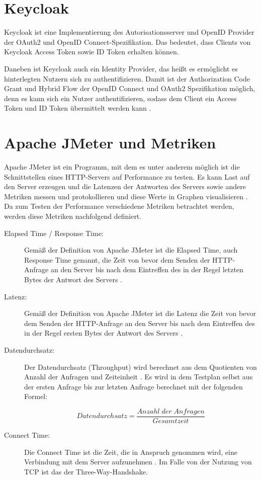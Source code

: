 \section{Keycloak}
Keycloak ist eine Implementierung des Autorisationsserver und OpenID Provider der 
OAuth2 und OpenID Connect-Spezifikation. Das bedeutet, dass Clients von Keycloak Access 
Token sowie ID Token erhalten können.\smallskip

Daneben ist Keycloak auch ein Identity Provider, das heißt es ermöglicht es hinterlegten 
Nutzern sich zu authentifizieren. Damit ist der Authorization Code Grant und 
Hybrid Flow der OpenID Connect und OAuth2 Spezifikation möglich, denn es kann sich ein 
Nutzer authentifizieren, sodass dem Client ein Access Token und ID Token übermittelt 
werden kann \citep{keycloak:2021}.

\section{Apache JMeter und Metriken}
\label{sec:ApacheJMeterundMetriken}
Apache JMeter ist ein Programm, mit dem es unter anderem möglich ist die Schnittstellen eines HTTP-Servers auf 
Performance zu testen. Es kann Last auf den Server erzeugen und die Latenzen der Antworten des Servers sowie andere Metriken messen und protokollieren und diese Werte in Graphen visualisieren \citep{jmeter:2021}.
Da zum Testen der Performance verschiedene Metriken betrachtet werden, werden diese 
Metriken nachfolgend definiert. 

\begin{description}
  \item[Elapsed Time / Response Time:] Gemäß der Definition von Apache JMeter ist die Elapsed Time, auch Response Time 
  genannt, die Zeit von bevor dem Senden der HTTP-Anfrage an den Server bis nach dem 
  Eintreffen des in der Regel letzten Bytes der Antwort des Servers \citep{jmeterglossary:2021}. 
  \item[Latenz:] Gemäß der Definition von Apache JMeter ist die Latenz die Zeit von bevor dem Senden der 
  HTTP-Anfrage an den Server bis nach dem Eintreffen des in der Regel ersten Bytes der 
  Antwort des Servers \citep{jmeterglossary:2021}. 
  \item[Datendurchsatz:] Der Datendurchsatz (Throughput) wird berechnet aus dem Quotienten von Anzahl der Anfragen 
  und Zeiteinheit \citep{jmeterglossary:2021}. Es wird in dem Testplan selbst aus der ersten Anfrage bis zur letzten 
  Anfrage berechnet mit der folgenden Formel:

  \begin{equation}
    Datendurchsatz = \frac{Anzahl\;der\;Anfragen}{Gesamtzeit} 
  \end{equation}

  \item[Connect Time:] Die Connect Time ist die Zeit, die in Anspruch genommen wird, eine Verbindung mit dem 
  Server aufzunehmen \citep{jmeterglossary:2021}. Im Falle von der Nutzung von \ac{TCP} ist das der Three-Way-Handshake. 
\end{description}

